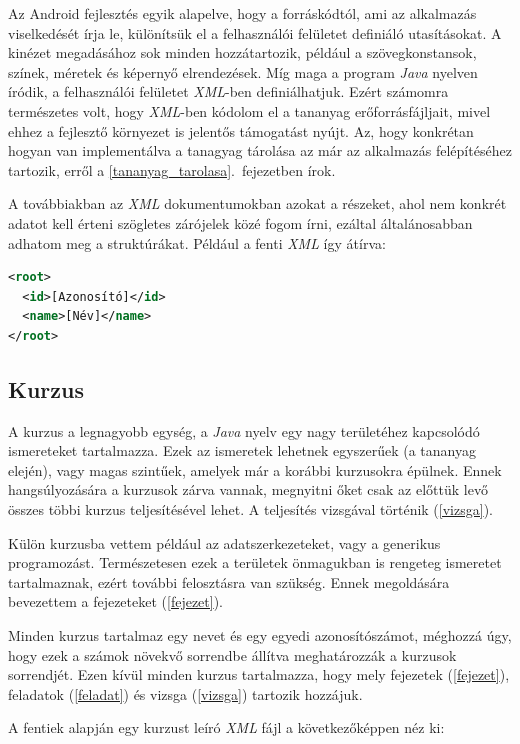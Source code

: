 \documentclass[12pt,a4paper]{article}
\newcommand{\xml}{\textit{XML}\xspace}
\begin{document}
	Az Android fejlesztés egyik alapelve, hogy a forráskódtól, ami az alkalmazás viselkedését írja le, különítsük el a felhasználói felületet definiáló utasításokat. A kinézet megadásához sok minden hozzátartozik, például a szövegkonstansok, színek, méretek és képernyő elrendezések. Míg maga a program \textit{Java} nyelven íródik, a felhasználói felületet \xml-ben definiálhatjuk. Ezért számomra természetes volt, hogy \xml-ben kódolom el a tananyag erőforrásfájljait, mivel ehhez a fejlesztő környezet is jelentős támogatást nyújt. Az, hogy konkrétan hogyan van implementálva a tanagyag tárolása az már az alkalmazás felépítéséhez tartozik, erről a \ref{tananyag_tarolasa}.\ fejezetben írok.
	
	A továbbiakban az \xml dokumentumokban azokat a részeket, ahol nem konkrét adatot kell érteni szögletes zárójelek közé fogom írni, ezáltal általánosabban adhatom meg a struktúrákat. Például a fenti \xml így átírva:
	
	\bigskip
	\begin{lstlisting}[language=XML]
<root>
  <id>[Azonosító]</id>
  <name>[Név]</name>
</root>
	\end{lstlisting}
	
	\subsection{Kurzus}
	\bigskip
	
	A kurzus a legnagyobb egység, a \textit{Java} nyelv egy nagy területéhez kapcsolódó ismereteket tartalmazza. Ezek az ismeretek lehetnek egyszerűek (a tananyag elején), vagy magas szintűek, amelyek már a korábbi kurzusokra épülnek. Ennek hangsúlyozására a kurzusok zárva vannak, megnyitni őket csak az előttük levő összes többi kurzus teljesítésével lehet. A teljesítés vizsgával történik (\ref{vizsga}).
	
	Külön kurzusba vettem például az adatszerkezeteket, vagy a generikus programozást. Természetesen ezek a területek önmagukban is rengeteg ismeretet tartalmaznak, ezért további felosztásra van szükség. Ennek megoldására bevezettem a fejezeteket (\ref{fejezet}).
	
	Minden kurzus tartalmaz egy nevet és egy egyedi azonosítószámot, méghozzá úgy, hogy ezek a számok növekvő sorrendbe állítva meghatározzák a kurzusok sorrendjét.
	Ezen kívül minden kurzus tartalmazza, hogy mely fejezetek (\ref{fejezet}), feladatok (\ref{feladat}) és vizsga (\ref{vizsga}) tartozik hozzájuk.
	
	A fentiek alapján egy kurzust leíró \xml fájl a következőképpen néz ki:
	
\end{document}
